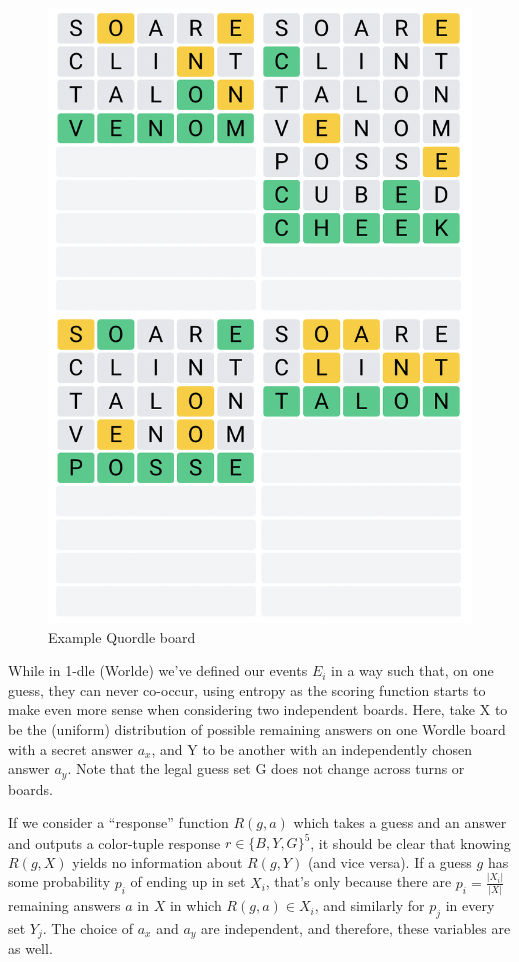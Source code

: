 \documentclass[11pt, oneside]{article} 	%
\begin{document}
\begin{figure}[!htb]
\centering
\includegraphics[scale=.3]{quordle}
\caption{Example Quordle board}
\end{figure}


While in 1-dle (Worlde) we've defined our events $E_i$ in a way such that, on one guess, they can never co-occur, using entropy as the scoring function starts to make even more sense when considering two independent boards. Here, take X to be the (uniform) distribution of possible remaining answers on one Wordle board with a secret answer $a_x$, and Y to be another with an independently chosen answer $a_y$. Note that the legal guess set G does not change across turns or boards.



If we consider a ``response'' function $R(g, a)$ which takes a guess and an answer and outputs a color-tuple response $r \in \{B, Y, G\}^5$, it should be clear that knowing $R(g, X)$ yields no information about $R(g, Y)$ (and vice versa). If a guess $g$ has some probability $p_i$ of ending up in set $X_i$, that's only because there are $p_i = \frac{|X_i|}{|X|}$ remaining answers $a$ in $X$ in which $R(g, a) \in X_i$, and similarly for $p_j$ in every set $Y_j$. The choice of $a_x$ and $a_y$ are independent, and therefore, these variables are as well.
\end{document}
